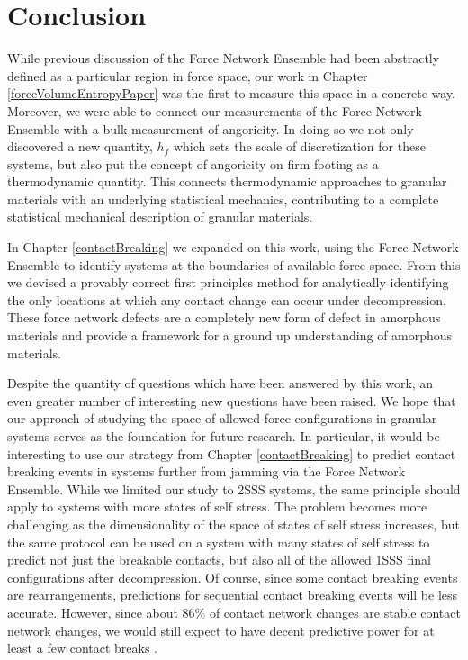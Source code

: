 \chapter{Conclusion}

While previous discussion of the Force Network Ensemble had been abstractly defined as a particular region in force space, our work in Chapter \ref{forceVolumeEntropyPaper} was the first to measure this space in a concrete way. Moreover, we were able to connect our measurements of the Force Network Ensemble with a bulk measurement of angoricity. In doing so we not only discovered a new quantity, $h_f$ which sets the scale of discretization for these systems, but also put the concept of angoricity on firm footing as a thermodynamic quantity. This connects thermodynamic approaches to granular materials with an underlying statistical mechanics, contributing to a complete statistical mechanical description of granular materials.

In Chapter \ref{contactBreaking} we expanded on this work, using the Force Network Ensemble to identify systems at the boundaries of available force space. From this we devised a provably correct first principles method for analytically identifying the only locations at which any contact change can occur under decompression. These force network defects are a completely new form of defect in amorphous materials and provide a framework for a ground up understanding of amorphous materials.

Despite the quantity of questions which have been answered by this work, an even greater number of interesting new questions have been raised. We hope that our approach of studying the space of allowed force configurations in granular systems serves as the foundation for future research. In particular, it would be interesting to use our strategy from Chapter \ref{contactBreaking} to predict contact breaking events in systems further from jamming via the Force Network Ensemble. While we limited our study to 2SSS systems, the same principle should apply to systems with more states of self stress. The problem becomes more challenging as the dimensionality of the space of states of self stress increases, but the same protocol can be used on a system with many states of self stress to predict not just the breakable contacts, but also all of the allowed 1SSS final configurations after decompression. Of course, since some contact breaking events are rearrangements, predictions for sequential contact breaking events will be less accurate. However, since about $86\%$ of contact network changes are stable contact network changes, we would still expect to have decent predictive power for at least a few contact breaks \cite{morse_differences_2020,tuckman_contact_2020}.

